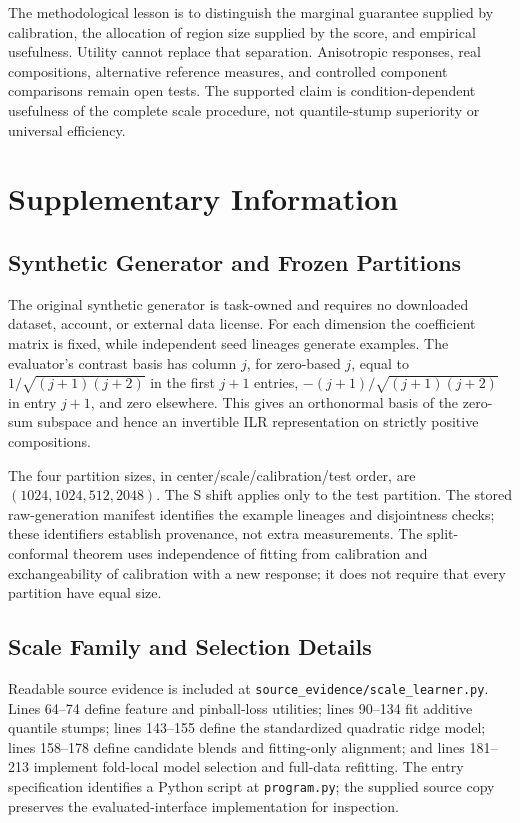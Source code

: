 \documentclass{article}
\begin{document}
The methodological lesson is to distinguish the marginal guarantee supplied by calibration, the allocation of region size supplied by the score, and empirical usefulness. Utility cannot replace that separation. Anisotropic responses, real compositions, alternative reference measures, and controlled component comparisons remain open tests. The supported claim is condition-dependent usefulness of the complete scale procedure, not quantile-stump superiority or universal efficiency.

\clearpage


\clearpage
\appendix
\section{Supplementary Information}
\subsection{Synthetic Generator and Frozen Partitions}
The original synthetic generator is task-owned and requires no downloaded dataset, account, or external data license. For each dimension the coefficient matrix is fixed, while independent seed lineages generate examples. The evaluator's contrast basis has column $j$, for zero-based $j$, equal to $1/\sqrt{(j+1)(j+2)}$ in the first $j+1$ entries, $-(j+1)/\sqrt{(j+1)(j+2)}$ in entry $j+1$, and zero elsewhere. This gives an orthonormal basis of the zero-sum subspace and hence an invertible ILR representation on strictly positive compositions.

The four partition sizes, in center/scale/calibration/test order, are $(1024,1024,512,2048)$. The S shift applies only to the test partition. The stored raw-generation manifest identifies the example lineages and disjointness checks; these identifiers establish provenance, not extra measurements. The split-conformal theorem uses independence of fitting from calibration and exchangeability of calibration with a new response; it does not require that every partition have equal size.

\subsection{Scale Family and Selection Details}
Readable source evidence is included at \texttt{source\_evidence/scale\_learner.py}. Lines 64--74 define feature and pinball-loss utilities; lines 90--134 fit additive quantile stumps; lines 143--155 define the standardized quadratic ridge model; lines 158--178 define candidate blends and fitting-only alignment; and lines 181--213 implement fold-local model selection and full-data refitting. The entry specification identifies a Python script at \texttt{program.py}; the supplied source copy preserves the evaluated-interface implementation for inspection.
\end{document}
